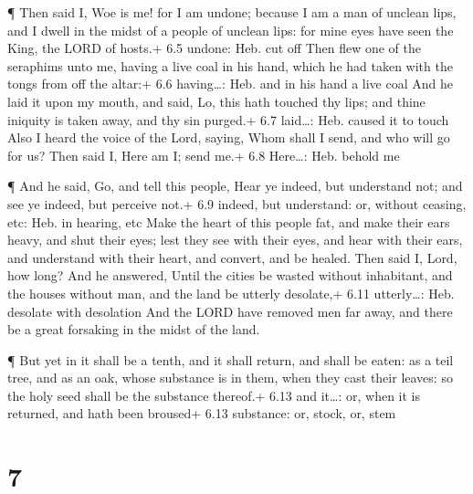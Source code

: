  ¶ Then said I, Woe is me! for I am undone; because I am a
man of unclean lips, and I dwell in the midst of a people of unclean
lips: for mine eyes have seen the King, the LORD of hosts.+ 6.5 undone:
Heb. cut off  Then flew one of the seraphims unto me, having
a live coal in his hand, which he had taken with the tongs from off the
altar:+ 6.6 having\ldots: Heb. and in his hand a live coal 
And he laid it upon my mouth, and said, Lo, this hath touched thy lips;
and thine iniquity is taken away, and thy sin purged.+ 6.7 laid\ldots:
Heb. caused it to touch  Also I heard the voice of the Lord,
saying, Whom shall I send, and who will go for us? Then said I, Here am
I; send me.+ 6.8 Here\ldots: Heb. behold me

 ¶ And he said, Go, and tell this people, Hear ye indeed,
but understand not; and see ye indeed, but perceive not.+ 6.9 indeed,
but understand: or, without ceasing, etc: Heb. in hearing, etc
 Make the heart of this people fat, and make their ears
heavy, and shut their eyes; lest they see with their eyes, and hear with
their ears, and understand with their heart, and convert, and be healed.
 Then said I, Lord, how long? And he answered, Until the
cities be wasted without inhabitant, and the houses without man, and the
land be utterly desolate,+ 6.11 utterly\ldots: Heb. desolate with
desolation  And the LORD have removed men far away, and
there be a great forsaking in the midst of the land.

 ¶ But yet in it shall be a tenth, and it shall return, and
shall be eaten: as a teil tree, and as an oak, whose substance is in
them, when they cast their leaves: so the holy seed shall be the
substance thereof.+ 6.13 and it\ldots: or, when it is returned, and hath
been broused+ 6.13 substance: or, stock, or, stem

\hypertarget{section-6}{%
\section{7}\label{section-6}}

